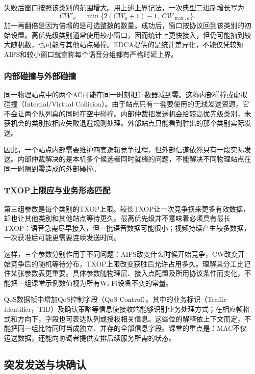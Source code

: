 失败后窗口按照该类别的范围增大。用上述上界记法，一次典型二进制增长写为
\begin{equation}
CW'_a=\min\{2(CW_a+1)-1,\ CW_{\max,a}\}.
\end{equation}
加一再翻倍是因为倍增的是可选整数的数量。成功后，窗口按协议回到该类别的初始设置。高优先级类别通常使用较小窗口，因而统计上更快接入，但仍可能抽到较大随机数，也可能与其他站点碰撞。EDCA提供的是统计差异化，不能仅凭较短AIFS和较小窗口就宣称每个语音分组都有严格时延上界。

\subsubsection{内部碰撞与外部碰撞}

同一物理站点中的两个AC可能在同一时刻把计数器减到零。这称内部碰撞或虚拟碰撞（Internal/Virtual Collision）。由于站点只有一套要使用的无线发送资源，它不会让两个队列真的同时在空中碰撞。内部仲裁把发送机会给较高优先级类别，未获机会的类别按相应失败退避规则处理。外部站点只能看到胜出的那个类别实际发送。

因此，一个站点内部需要维护四套逻辑竞争过程，但外部信道依然只有一段实际发送。内部仲裁解决的是本机多个候选者同时就绪的问题，不能解决不同物理站点在同一时隙到零造成的外部碰撞。

\subsubsection{TXOP上限应与业务形态匹配}

第三组参数是每个类别的TXOP上限。较长TXOP让一次竞争换来更多有效数据，却也让其他类别和其他站点等待更久。最高优先级并不意味着必须具有最长TXOP：语音急需尽早接入，但一批语音数据可能很小；视频持续产生较多数据，一次获准后可能更需要连续发送时间。

这样，三个参数分别作用于不同问题：AIFS改变什么时候开始竞争，CW改变开始竞争后的随机等待分布，TXOP上限改变获胜后允许占用多久。理解其分工比记住某张参数表更重要。具体参数随物理层、接入点配置及所用协议条件而变化，不能把一组课堂示例数值视为所有Wi-Fi设备不变的常量。

QoS数据帧中增加QoS控制字段（QoS Control）。其中的业务标识（Traffic Identifier，TID）及确认策略等信息使接收端能够识别业务处理方式；在相应帧格式和方向下，字段也可表达队列或授权相关信息。这些位的解释依上下文而定，不能把同一组比特同时当成独立、并存的全部信息字段。课堂的重点是：MAC不仅运送数据，还能向协调者提供安排后续服务所需的状态。

\subsection{突发发送与块确认}

